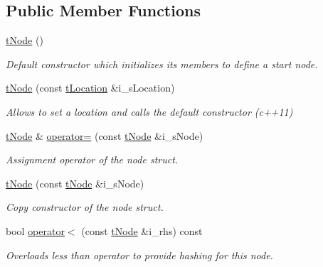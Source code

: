 \subsection*{Public Member Functions}
\begin{DoxyCompactItemize}
\item 
\mbox{\hyperlink{structplanner_1_1t_node_a83ff217ef060b93698045b2357999594}{t\+Node}} ()
\begin{DoxyCompactList}\small\item\em Default constructor which initializes its members to define a start node. \end{DoxyCompactList}\item 
\mbox{\label{structplanner_1_1t_node_a6728fd921145674d77dec553aad10824}} 
\mbox{\hyperlink{structplanner_1_1t_node_a6728fd921145674d77dec553aad10824}{t\+Node}} (const \mbox{\hyperlink{structplanner_1_1t_location}{t\+Location}} \&i\+\_\+s\+Location)
\begin{DoxyCompactList}\small\item\em Allows to set a location and calls the default constructor (c++11) \end{DoxyCompactList}\item 
\mbox{\label{structplanner_1_1t_node_abcbfb81ac371e43234f66072547af049}} 
\mbox{\hyperlink{structplanner_1_1t_node}{t\+Node}} \& \mbox{\hyperlink{structplanner_1_1t_node_abcbfb81ac371e43234f66072547af049}{operator=}} (const \mbox{\hyperlink{structplanner_1_1t_node}{t\+Node}} \&i\+\_\+s\+Node)
\begin{DoxyCompactList}\small\item\em Assignment operator of the node struct. \end{DoxyCompactList}\item 
\mbox{\label{structplanner_1_1t_node_a18891f54e73f974f1142fba95887de98}} 
\mbox{\hyperlink{structplanner_1_1t_node_a18891f54e73f974f1142fba95887de98}{t\+Node}} (const \mbox{\hyperlink{structplanner_1_1t_node}{t\+Node}} \&i\+\_\+s\+Node)
\begin{DoxyCompactList}\small\item\em Copy constructor of the node struct. \end{DoxyCompactList}\item 
bool \mbox{\hyperlink{structplanner_1_1t_node_a5085f3fcf4a960ed9fe14068f1b5e950}{operator$<$}} (const \mbox{\hyperlink{structplanner_1_1t_node}{t\+Node}} \&i\+\_\+rhs) const
\begin{DoxyCompactList}\small\item\em Overloads less than operator to provide hashing for this node. \end{DoxyCompactList}\end{DoxyCompactItemize}
